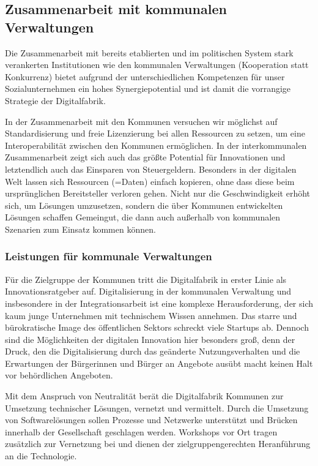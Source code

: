\documentclass[12pt, a4paper]{article} %
\begin{document}
\hypertarget{zusammenarbeit-mit-kommunalen-verwaltungen}{%
\subsection{Zusammenarbeit mit kommunalen
Verwaltungen}\label{zusammenarbeit-mit-kommunalen-verwaltungen}}

Die Zusammenarbeit mit bereits etablierten und im politischen System
stark verankerten Institutionen wie den kommunalen Verwaltungen
(Kooperation statt Konkurrenz) bietet aufgrund der unterschiedlichen
Kompetenzen für unser Sozialunternehmen ein hohes Synergiepotential und
ist damit die vorrangige Strategie der Digitalfabrik.

In der Zusammenarbeit mit den Kommunen versuchen wir möglichst auf
Standardisierung und freie Lizenzierung bei allen Ressourcen zu setzen,
um eine Interoperabilität zwischen den Kommunen ermöglichen. In der
interkommunalen Zusammenarbeit zeigt sich auch das größte Potential für
Innovationen und letztendlich auch das Einsparen von Steuergeldern.
Besonders in der digitalen Welt lassen sich Ressourcen (=Daten) einfach
kopieren, ohne dass diese beim ursprünglichen Bereitsteller verloren
gehen. Nicht nur die Geschwindigkeit erhöht sich, um Lösungen
umzusetzen, sondern die über Kommunen entwickelten Lösungen schaffen
Gemeingut, die dann auch außerhalb von kommunalen Szenarien zum Einsatz
kommen können.

\hypertarget{leistungen-fuxfcr-kommunale-verwaltungen}{%
\subsubsection{Leistungen für kommunale
Verwaltungen}\label{leistungen-fuxfcr-kommunale-verwaltungen}}

Für die Zielgruppe der Kommunen tritt die Digitalfabrik in erster Linie
als Innovationsratgeber auf. Digitalisierung in der kommunalen
Verwaltung und insbesondere in der Integrationsarbeit ist eine komplexe
Herausforderung, der sich kaum junge Unternehmen mit technischem Wissen
annehmen. Das starre und bürokratische Image des öffentlichen Sektors
schreckt viele Startups ab. Dennoch sind die Möglichkeiten der digitalen
Innovation hier besonders groß, denn der Druck, den die Digitalisierung
durch das geänderte Nutzungsverhalten und die Erwartungen der
Bürgerinnen und Bürger an Angebote ausübt macht keinen Halt vor
behördlichen Angeboten.

Mit dem Anspruch von Neutralität berät die Digitalfabrik Kommunen zur
Umsetzung technischer Lösungen, vernetzt und vermittelt. Durch die
Umsetzung von Softwarelösungen sollen Prozesse und Netzwerke unterstützt
und Brücken innerhalb der Gesellschaft geschlagen werden. Workshops vor
Ort tragen zusätzlich zur Vernetzung bei und dienen der
zielgruppengerechten Heranführung an die Technologie.
\end{document}
